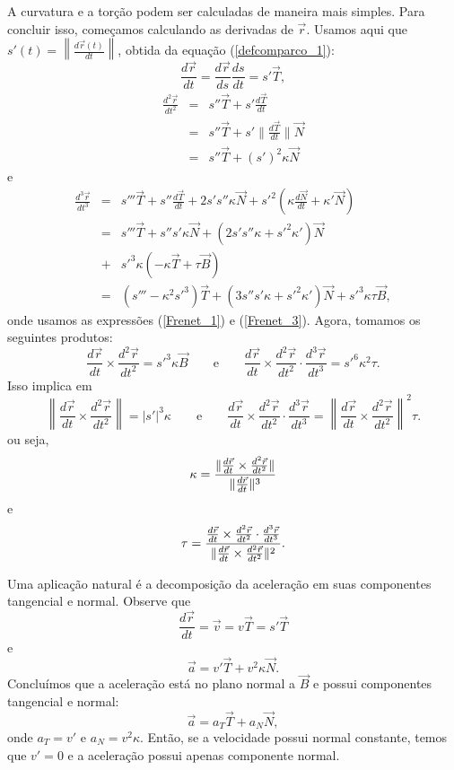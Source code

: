 A curvatura e a torção podem ser calculadas de maneira mais simples. Para concluir isso, começamos calculando as derivadas de $\vec{r}$. Usamos aqui que $s'(t)=\left\|\frac{d\vec{r}(t)}{dt}\right\|$, obtida da equação (\ref{defcomparco_1}):
$$
\frac{d\vec{r}}{dt}=\frac{d\vec{r}}{ds}\frac{ds}{dt}=s' \vec{T},
$$
\begin{eqnarray*}
\frac{d^2\vec{r}}{dt^2}&=&s'' \vec{T}+s' \frac{d\vec{T}}{dt}\\&=&s'' \vec{T}+s' \|\frac{d\vec{T}}{dt}\|\vec{N}\\
&=&s'' \vec{T}+(s')^2 \kappa \vec{N}
\end{eqnarray*}
e
\begin{eqnarray*}
\frac{d^3\vec{r}}{dt^3}&=&s''' \vec{T}+s''\frac{d\vec{T}}{dt}+2s's''\kappa \vec{N}+s'^2 \left(\kappa \frac{d\vec{N}}{dt}+\kappa' \vec{N}\right)\\
&=&s''' \vec{T}+s''s'\kappa \vec{N}+\left(2s's''\kappa+s'^2\kappa'\right) \vec{N}\\
&+&s'^3 \kappa (-\kappa \vec{T}+\tau\vec{B})\\
&=&\left(s'''-\kappa^2s'^3\right) \vec{T}+\left(3s''s'\kappa +s'^2\kappa'\right)\vec{N}+s'^3 \kappa \tau\vec{B},
\end{eqnarray*}
onde usamos as expressões (\ref{Frenet_1}) e (\ref{Frenet_3}). Agora, tomamos os seguintes produtos:
$$
\frac{d\vec{r}}{dt} \times \frac{d^2 \vec{r}}{dt^2}=s'^3\kappa \vec{B}\qquad\text{e}\qquad
\frac{d\vec{r}}{dt} \times \frac{d^2\vec{r}}{dt^2} \cdot \frac{d^3\vec{r}}{dt^3}=s'^6\kappa^2\tau.
$$
Isso implica em 
$$
\left\|\frac{d\vec{r}}{dt} \times \frac{d^2\vec{r}}{dt^2}\right\|=|s'|^3\kappa\qquad\text{e}\qquad
\frac{d\vec{r}}{dt} \times \frac{d^2\vec{r}}{dt^2} \cdot \frac{d^3 \vec{r}}{dt^3}=\left\|\frac{d\vec{r}}{dt} \times \frac{d^2\vec{r}}{dt^2}\right\|^2\tau.
$$
ou seja,
\begin{equation}{\label{curvatura_2}}
\kappa =\frac{\|\frac{d\vec{r}}{dt} \times \frac{d^2 \vec{r}}{dt^2}\|}{\|\frac{d\vec{r}}{dt}\|^3}
\end{equation}
e
\begin{equation}{\label{torcao_2}}
\tau=\frac{\frac{d\vec{r}}{dt} \times \frac{d^2 \vec{r}}{dt^2} \cdot \frac{d^3 \vec{r}}{dt^3} }{\|\frac{d\vec{r}}{dt} \times \frac{d^2\vec{r}}{dt^2}\|^2}.
\end{equation}

\begin{obs}Uma aplicação natural é a decomposição da aceleração em suas componentes tangencial e normal. Observe que
$$
\frac{d\vec{r}}{dt}=\vec{v}=v\vec{T}=s' \vec{T}
$$
e
$$
\vec{a}=v' \vec{T}+v^2 \kappa \vec{N}.
$$
Concluímos que a aceleração está no plano normal a $\vec{B}$ e possui componentes tangencial e normal:
$$
\vec{a}=a_T \vec{T}+a_N \vec{N},
$$
onde $a_T=v'$ e $a_N=v^2\kappa$. Então, se a velocidade possui normal constante, temos que $v'=0$ e a aceleração possui apenas componente normal.

\end{obs}


